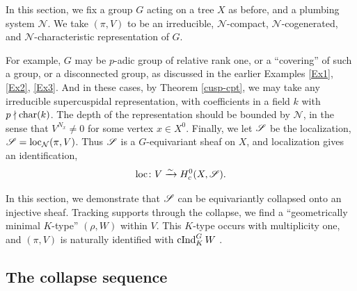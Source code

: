 \documentclass[letter]{amsart}
\theoremstyle{definition}
\theoremstyle{remark}
\numberwithin{thm}{section}
\numberwithin{equation}{section}
\renewcommand{\NN}{{\mathcal N}}
\begin{document}
In this section, we fix a group $G$ acting on a tree $X$ as before, and a plumbing system $\NN$.  We take $(\pi, V)$ to be an irreducible, $\NN$-compact, $\NN$-cogenerated, and $\NN$-characteristic representation of $G$.  

For example, $G$ may be $p$-adic group of relative rank one, or a ``covering'' of such a group, or a disconnected group, as discussed in the earlier Examples \ref{Ex1}, \ref{Ex2}, \ref{Ex3}.  And in these cases, by Theorem \ref{cusp-cpt}, we may take any irreducible supercuspidal representation, with coefficients in a field $k$ with $p \nmid \operatorname{char}(k)$.  The depth of the representation should be bounded by $\NN$, in the sense that $V^{N_x} \neq 0$ for some vertex $x \in X^0$.  Finally, we let ${\mathscr{S}}$ be the localization, $\sheaf{S} = \loc_\NN(\pi, V)$.  Thus ${\mathscr{S}}$ is a $G$-equivariant sheaf on $X$, and localization gives an identification,
$$\operatorname{loc} \colon V \xrightarrow{\sim} H_c^0(X, {\mathscr{S}}).$$

In this section, we demonstrate that ${\mathscr{S}}$ can be equivariantly collapsed onto an injective sheaf.  Tracking supports through the collapse, we find a ``geometrically minimal $K$-type'' $(\rho, W)$ within $V$.  This $K$-type occurs with multiplicity one, and $(\pi, V)$ is naturally identified with $\operatorname{cInd}_K^G W$ .  

\subsection{The collapse sequence}
\end{document}
